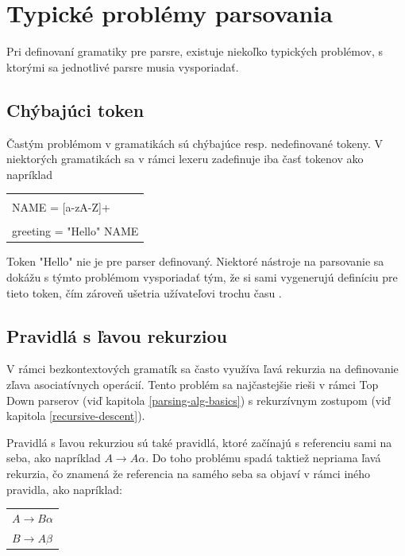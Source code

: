 \section{Typické problémy parsovania}
Pri definovaní gramatiky pre parsre, existuje niekoľko typických problémov, s ktorými sa jednotlivé parsre musia vysporiadať. 

\subsection{Chýbajúci token}
Častým problémom v gramatikách sú chýbajúce resp. nedefinované tokeny. V niektorých gramatikách sa v rámci lexeru zadefinuje iba časť tokenov ako napríklad

\begin{center}
\begin{tabular}{p{}}
\color{editorGray}{/* Lexer */}\\
NAME = [a-zA-Z]+\\
\color{editorGray}{/* Parser */}\\
greeting = "Hello"{ NAME}
\end{tabular}
\end{center}

Token "Hello"{ }nie je pre parser definovaný. Niektoré nástroje na parsovanie sa dokážu s týmto problémom vysporiadať tým, že si sami vygenerujú definíciu pre tieto token, čím zároveň ušetria užívateľovi trochu času \cite{tomassetti:parsing}.

\subsection{Pravidlá s ľavou rekurziou}\label{left-recursion-rule}
V rámci bezkontextových gramatík sa často využíva ľavá rekurzia na definovanie zľava asociatívnych operácií. Tento problém sa najčastejšie rieši v rámci Top Down parserov (viď kapitola \ref{parsing-alg-basics}) s rekurzívnym zostupom (viď kapitola \ref{recursive-descent}). 

Pravidlá s ľavou rekurziou sú také pravidlá, ktoré začínajú s referenciu sami na seba, ako napríklad $A \rightarrow A\alpha$. Do toho problému spadá taktiež nepriama ľavá rekurzia, čo znamená že referencia na samého seba sa objaví v rámci iného pravidla, ako napríklad:

\begin{center}
\begin{tabular}{p{}}
$A \rightarrow B\alpha$\\
$B \rightarrow A\beta$\\
\end{tabular}
\end{center}

